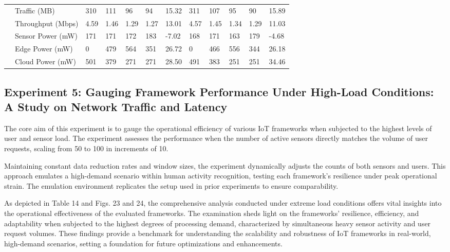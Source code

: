 \documentclass[11pt]{article}
\begin{document}
\begin{landscape}
\begin{table}[t]
{\begin{tabular}{llllllllllll}
					& Traffic (MB) & 310 & 111 & 96 & 94 & 15.32 & 311 & 107 & 95 & 90 & 15.89 \\
					& Throughput (Mbps)  & 4.59 & 1.46 & 1.29 & 1.27 & 13.01 & 4.57 & 1.45 & 1.34 & 1.29 & 11.03 \\
					& Sensor Power (mW) & 171 & 171 & 172 & 183 & -7.02 & 168 & 171 & 163 & 179 & -4.68 \\
					& Edge Power (mW) & 0 & 479 & 564 & 351 & 26.72 & 0 & 466 & 556 & 344 & 26.18 \\
					& Cloud Power (mW) & 501 & 379 & 271 & 271 & 28.50 & 491 & 383 & 251 & 251 & 34.46 \\
					\bottomrule
					
				\end{tabular}
			}
		\end{table}
	\end{landscape}
	
	\subsection{\textbf{Experiment 5:} Gauging Framework Performance Under High-Load Conditions: A Study on Network Traffic and Latency}
	The core aim of this experiment is to gauge the operational efficiency of various IoT
	frameworks when subjected to the highest levels of user and sensor load. The experiment assesses the performance when the number of active sensors directly matches
	the volume of user requests, scaling from 50 to 100 in increments of 10.
	
	Maintaining constant data reduction rates and window sizes, the experiment
	dynamically adjusts the counts of both sensors and users. This approach emulates a
	high-demand scenario within human activity recognition, testing each framework’s
	resilience under peak operational strain. The emulation environment replicates the
	setup used in prior experiments to ensure comparability.
	
	As depicted in Table 14 and Figs. 23 and 24, the comprehensive analysis conducted under extreme load conditions offers vital insights into the operational effectiveness of the evaluated frameworks. The examination sheds light on the frameworks’ resilience, efficiency, and adaptability when subjected to the highest degrees
	of processing demand, characterized by simultaneous heavy sensor activity and user
	request volumes. These findings provide a benchmark for understanding the scalability and robustness of IoT frameworks in real-world, high-demand scenarios, setting a foundation for future optimizations and enhancements.
	
\end{document}
